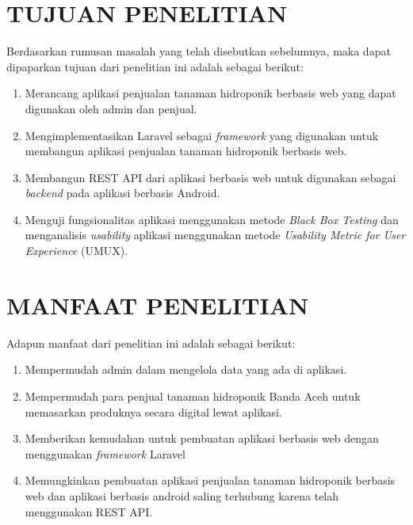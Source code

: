 \section{\uppercase{TUJUAN PENELITIAN}}
Berdasarkan rumusan masalah yang telah disebutkan sebelumnya, maka dapat dipaparkan tujuan dari penelitian ini adalah sebagai berikut:
\begin{enumerate}
	\item Merancang aplikasi penjualan tanaman hidroponik berbasis web yang dapat digunakan oleh admin dan penjual.
	\item Mengimplementasikan Laravel sebagai \textit{framework} yang digunakan untuk membangun aplikasi penjualan tanaman hidroponik berbasis web.
	\item Membangun REST API dari aplikasi berbasis web untuk digunakan sebagai \textit{backend} pada aplikasi berbasis Android.
	\item  Menguji fungsionalitas aplikasi menggunakan metode \textit{Black Box Testing} dan menganalisis \textit{usability} aplikasi menggunakan metode \textit{Usability Metric for User Experience} (UMUX).
\end{enumerate}


\section{\uppercase{MANFAAT PENELITIAN}}
Adapun manfaat dari penelitian ini adalah sebagai berikut:
\begin{enumerate}
	\item Mempermudah admin dalam mengelola data yang ada di aplikasi.
	\item Mempermudah para penjual tanaman hidroponik Banda Aceh untuk memasarkan produknya secara digital lewat aplikasi.
	\item Memberikan kemudahan untuk pembuatan aplikasi berbasis web dengan menggunakan \textit{framework} Laravel
	\item Memungkinkan pembuatan aplikasi penjualan tanaman hidroponik berbasis web dan aplikasi berbasis android saling terhubung karena telah menggunakan REST API.
\end{enumerate}

\begin{comment}

\end{comment}